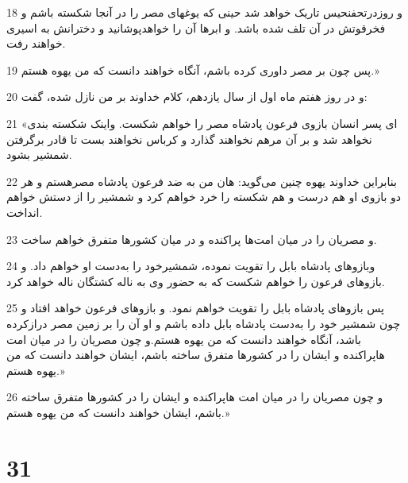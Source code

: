 \par 18 و روزدرتحفنحیس تاریک خواهد شد حینی که یوغهای مصر را در آنجا شکسته باشم و فخرقوتش در آن تلف شده باشد. و ابرها آن را خواهدپوشانید و دخترانش به اسیری خواهند رفت.
\par 19 پس چون بر مصر داوری کرده باشم، آنگاه خواهند دانست که من یهوه هستم.»
\par 20 و در روز هفتم ماه اول از سال یازدهم، کلام خداوند بر من نازل شده، گفت:
\par 21 «ای پسر انسان بازوی فرعون پادشاه مصر را خواهم شکست. واینک شکسته بندی نخواهد شد و بر آن مرهم نخواهند گذارد و کرباس نخواهند بست تا قادر برگرفتن شمشیر بشود.
\par 22 بنابراین خداوند یهوه چنین می‌گوید: هان من به ضد فرعون پادشاه مصرهستم و هر دو بازوی او هم درست و هم شکسته را خرد خواهم کرد و شمشیر را از دستش خواهم انداخت.
\par 23 و مصریان را در میان امت‌ها پراکنده و در میان کشورها متفرق خواهم ساخت.
\par 24 وبازوهای پادشاه بابل را تقویت نموده، شمشیرخود را به‌دست او خواهم داد. و بازوهای فرعون را خواهم شکست که به حضور وی به ناله کشتگان ناله خواهد کرد.
\par 25 پس بازوهای پادشاه بابل را تقویت خواهم نمود. و بازوهای فرعون خواهد افتاد و چون شمشیر خود را به‌دست پادشاه بابل داده باشم و او آن را بر زمین مصر درازکرده باشد، آنگاه خواهند دانست که من یهوه هستم.و چون مصریان را در میان امت هاپراکنده و ایشان را در کشورها متفرق ساخته باشم، ایشان خواهند دانست که من یهوه هستم.»
\par 26 و چون مصریان را در میان امت هاپراکنده و ایشان را در کشورها متفرق ساخته باشم، ایشان خواهند دانست که من یهوه هستم.»

\chapter{31}

